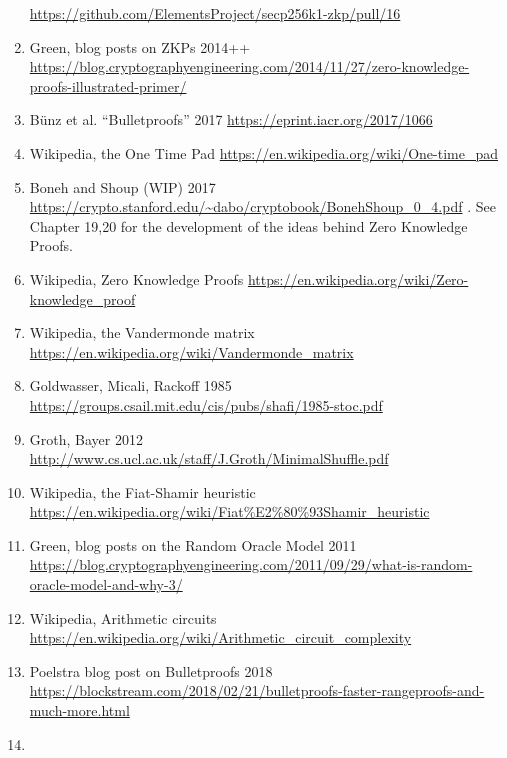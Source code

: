 \documentclass[10pt,a4paper]{article}
\begin{document}
\begin{enumerate}
  \url{https://github.com/ElementsProject/secp256k1-zkp/pull/16}
\item
  \protect\hypertarget{anchor-26}{}{}Green, blog posts on ZKPs 2014++
  \url{https://blog.cryptographyengineering.com/2014/11/27/zero-knowledge-proofs-illustrated-primer/}
\item
  \protect\hypertarget{anchor-6}{}{}Bünz et al. ``Bulletproofs'' 2017
  \url{https://eprint.iacr.org/2017/1066}
\item
  \protect\hypertarget{anchor-19}{}{}Wikipedia, the One Time Pad
  \url{https://en.wikipedia.org/wiki/One-time_pad}
\item
  \protect\hypertarget{anchor-27}{}{}Boneh and Shoup (WIP) 2017
  \url{https://crypto.stanford.edu/~dabo/cryptobook/BonehShoup_0_4.pdf}
  . See Chapter 19,20 for the development of the ideas behind Zero
  Knowledge Proofs.
\item
  \protect\hypertarget{anchor-28}{}{}Wikipedia, Zero Knowledge Proofs
  \url{https://en.wikipedia.org/wiki/Zero-knowledge_proof}
\item
  \protect\hypertarget{anchor-30}{}{}Wikipedia, the Vandermonde matrix
  \url{https://en.wikipedia.org/wiki/Vandermonde_matrix}
\item
  \protect\hypertarget{anchor-33}{}{}Goldwasser, Micali, Rackoff 1985
  \url{https://groups.csail.mit.edu/cis/pubs/shafi/1985-stoc.pdf}
\item
  \protect\hypertarget{anchor-42}{}{}Groth, Bayer 2012 \\
  \url{http://www.cs.ucl.ac.uk/staff/J.Groth/MinimalShuffle.pdf}
\item
  \protect\hypertarget{anchor-59}{}{}Wikipedia, the Fiat-Shamir
  heuristic \\
  \href{https://en.wikipedia.org/wiki/Fiat–Shamir_heuristic}{https://en.wikipedia.org/wiki/Fiat\%E2\%80\%93Shamir\_heuristic}
\item
  \protect\hypertarget{anchor-60}{}{}Green, blog posts on the Random
  Oracle Model 2011
  \url{https://blog.cryptographyengineering.com/2011/09/29/what-is-random-oracle-model-and-why-3/}
\item
  \protect\hypertarget{anchor-68}{}{}Wikipedia, Arithmetic circuits \\
  \url{https://en.wikipedia.org/wiki/Arithmetic_circuit_complexity}
\item
  \protect\hypertarget{anchor-69}{}{}Poelstra blog post on Bulletproofs
  2018
  \url{https://blockstream.com/2018/02/21/bulletproofs-faster-rangeproofs-and-much-more.html}
\item

\end{enumerate}
\end{document}

